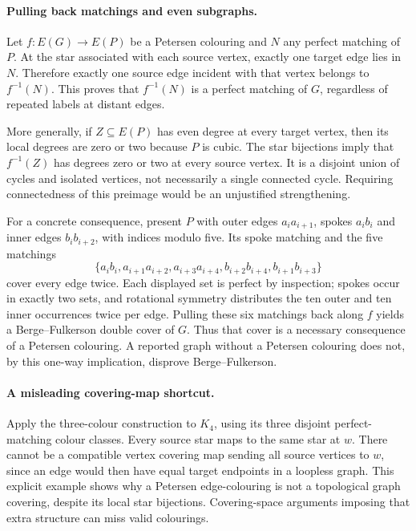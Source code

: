 \documentclass[11pt,a4paper]{article}
\begin{document}
\paragraph{Pulling back matchings and even subgraphs.}
Let $f:E(G)\to E(P)$ be a Petersen colouring and $N$ any perfect matching of $P$. At the star associated with each source vertex, exactly one target edge lies in $N$. Therefore exactly one source edge incident with that vertex belongs to $f^{-1}(N)$. This proves that $f^{-1}(N)$ is a perfect matching of $G$, regardless of repeated labels at distant edges.

More generally, if $Z\subseteq E(P)$ has even degree at every target vertex, then its local degrees are zero or two because $P$ is cubic. The star bijections imply that $f^{-1}(Z)$ has degrees zero or two at every source vertex. It is a disjoint union of cycles and isolated vertices, not necessarily a single connected cycle. Requiring connectedness of this preimage would be an unjustified strengthening.

For a concrete consequence, present $P$ with outer edges $a_i a_{i+1}$, spokes $a_i b_i$ and inner edges $b_i b_{i+2}$, with indices modulo five. Its spoke matching and the five matchings
\[
 \{a_i b_i,a_{i+1}a_{i+2},a_{i+3}a_{i+4},
 b_{i+2}b_{i+4},b_{i+1}b_{i+3}\}
\]
cover every edge twice. Each displayed set is perfect by inspection; spokes occur in exactly two sets, and rotational symmetry distributes the ten outer and ten inner occurrences twice per edge. Pulling these six matchings back along $f$ yields a Berge--Fulkerson double cover of $G$. Thus that cover is a necessary consequence of a Petersen colouring. A reported graph without a Petersen colouring does not, by this one-way implication, disprove Berge--Fulkerson.

\paragraph{A misleading covering-map shortcut.}
Apply the three-colour construction to $K_4$, using its three disjoint perfect-matching colour classes. Every source star maps to the same star at $w$. There cannot be a compatible vertex covering map sending all source vertices to $w$, since an edge would then have equal target endpoints in a loopless graph. This explicit example shows why a Petersen edge-colouring is not a topological graph covering, despite its local star bijections. Covering-space arguments imposing that extra structure can miss valid colourings.
\end{document}
